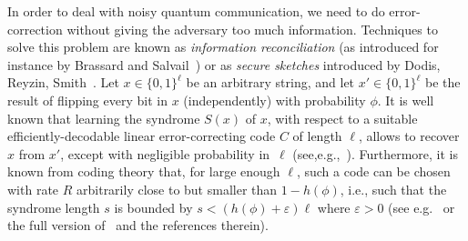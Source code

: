In order to deal with noisy quantum communication, we need to do
error-correction without giving the adversary too much information. 
%
Techniques to solve this problem are known as {\em information
  reconciliation} (as introduced for instance by Brassard and 
Salvail~\cite{BS93}) or as {\em secure sketches} introduced by Dodis,
Reyzin, Smith~\cite{DRS04}.  Let $x \in \{0,1\}^\ell$ be an
arbitrary string, and let $x' \in\{0,1\}^\ell$ be the result of
flipping every bit in $x$ (independently) with probability $\phi$. It
is well known that learning the syndrome $S(x)$ of $x$, with respect
to a suitable efficiently-decodable linear error-correcting code $C$
of length $\ell$, allows to recover $x$ from $x'$, except with negligible probability
in~$\ell$ (see,e.g.,~\cite{Maurer91,Crepeau97,DRS04}).  Furthermore,
it is known from coding theory that, for large enough $\ell$, such a
code can be chosen with rate $R$ arbitrarily close to but smaller than
$1 - h(\phi)$, i.e., such that the syndrome length $s$ is bounded by
$s < (h(\phi) + \varepsilon) \ell$ where $\varepsilon > 0$ (see
e.g.~\cite{Crepeau97} or the full version of~\cite{DRS04} and the
references therein).        %

